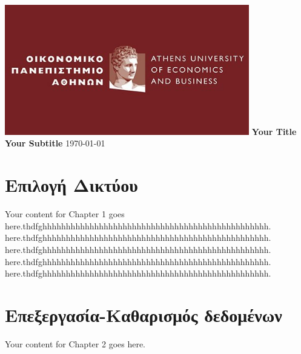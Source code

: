 \documentclass{article}
\begin{document}
	
	\begin{titlepage}
		\centering
		\includegraphics[width=0.8\textwidth]{aueb_logo.jpg}
		\vfill
		\Huge\textbf{Your Title}
		\vspace{1cm}
		\Large\textbf{Your Subtitle}
		\vfill
		\today
	\end{titlepage}
	
	\renewcommand{\contentsname}{Περιεχόμενα}
	\tableofcontents
	
	\newpage  %
	
	\section{Επιλογή Δικτύου}
	Your content for Chapter 1 goes here.thdfghhhhhhhhhhhhhhhhhhhhhhhhhhhhhhhhhhhhhhhhhhhhhhhh.
	here.thdfghhhhhhhhhhhhhhhhhhhhhhhhhhhhhhhhhhhhhhhhhhhhhhhh.
	here.thdfghhhhhhhhhhhhhhhhhhhhhhhhhhhhhhhhhhhhhhhhhhhhhhhh.\\
	here.thdfghhhhhhhhhhhhhhhhhhhhhhhhhhhhhhhhhhhhhhhhhhhhhhhh.
	here.thdfghhhhhhhhhhhhhhhhhhhhhhhhhhhhhhhhhhhhhhhhhhhhhhhh.
	\label{chap:network_selection}  %
	
	\section{Επεξεργασία-Καθαρισμός δεδομένων}
	Your content for Chapter 2 goes here.
	\label{chap:data_processing}  %
	
\end{document}
